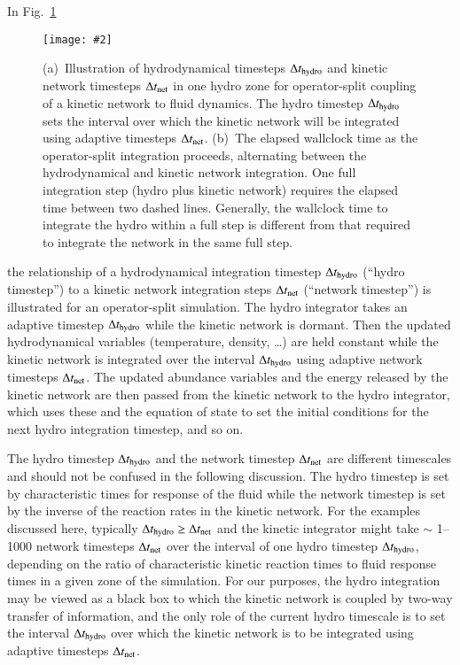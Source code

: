 \documentclass[]{elsart}
\newlength{\figdn}
\newcommand{\fig}[1]{Fig.~\ref{fig:#1}}
\newcommand{\tsub}[1]{_{\mbox{\scriptsize#1}}}
\newcommand{\singlefig}[6]{%
\begin{figure} \vspace{#3}%
\begin{flushright}%
\texttt{[image: \#2]}%
\end{flushright}%
\caption{\label{fig:#1} #6}%
\vspace{#4}%
\end{figure}}
\begin{document}
In \fig{hydro-networkTimesteps}
%
%
\singlefig
{hydro-networkTimesteps}
{figures/hydro-networkTimesteps_split_wallclock.eps}
{0pt}
{\figdn}
{0.72}
{(a)~Illustration of hydrodynamical timesteps $\Delta t\tsub{hydro}$ and kinetic
network timesteps $\Delta t\tsub{net}$ in one hydro zone for operator-split coupling of a
kinetic network to fluid dynamics. The hydro timestep $\Delta t\tsub{hydro}$ sets the
interval over which the kinetic network will be integrated using adaptive timesteps
$\Delta t\tsub{net}$. (b)~The elapsed wallclock time as the operator-split 
integration proceeds, alternating between the hydrodynamical and kinetic 
network integration. One full integration step (hydro plus kinetic network) 
requires the elapsed time between two dashed lines.  Generally, the wallclock 
time to integrate the hydro within a full step is different from that required 
to integrate the network in the same full step.}
%
%
the relationship of a hydrodynamical integration timestep $\Delta t\tsub{hydro}$ 
(``hydro timestep'') to a kinetic network integration steps $\Delta 
t\tsub{net}$ (``network timestep'') is illustrated for an operator-split 
simulation. The hydro integrator takes an adaptive timestep $\Delta 
t\tsub{hydro}$ while the kinetic network is dormant. Then the updated 
hydrodynamical variables (temperature, density,  \ldots) are held constant while 
the kinetic network is integrated over the interval $\Delta t\tsub{hydro}$ using 
adaptive network timesteps $\Delta t\tsub{net}$. The updated abundance variables 
and the energy released by the kinetic network are then passed from the kinetic 
network to the hydro integrator, which uses these and the equation of state to 
set the initial conditions for the next hydro integration timestep, and so on. 

The hydro timestep $\Delta t\tsub{hydro}$ and the network timestep
$\Delta t\tsub{net}$ are different timescales and should not be confused in the 
following discussion.  The hydro timestep is set by characteristic times for 
response of the fluid while the network timestep is set by the inverse of the 
reaction rates in the kinetic network.  For the examples discussed here, 
typically $\Delta t\tsub{hydro} \ge \Delta t\tsub{net}$ and the kinetic 
integrator might take $\sim$ 1--1000 network timesteps $\Delta t\tsub{net}$ 
over the interval of one hydro timestep $\Delta t\tsub{hydro}$, depending on 
the ratio of characteristic kinetic reaction times to fluid response times in 
a given zone of the simulation. For our purposes, the hydro integration 
may be viewed as a black box to which the kinetic network is coupled by two-way 
transfer of information, and the only role of the current hydro timescale is to 
set the interval $\Delta t\tsub{hydro}$ over which the kinetic network is to be 
integrated using adaptive timesteps $\Delta t\tsub{net}$.
\end{document}
